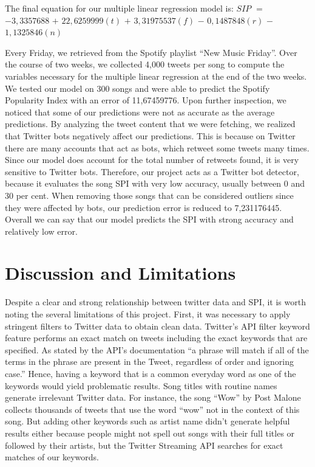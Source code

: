 \documentclass[12pt,conference]{IEEEtran}
\begin{document}
The final equation for our multiple linear regression model is: \newline
$SIP$ $=$ $-3,3357688$ $+$ $22,6259999(t)$ $+$ $3,31975537(f)$ $-$ $0,1487848(r)$ $-$ $1,1325846(n)$

Every Friday, we retrieved from the Spotify playlist ``New Music Friday''. Over the course of two weeks, we collected 4,000 tweets per song to compute the variables necessary for the multiple linear regression at the end of the two weeks. We tested our model on 300 songs and were able to predict the Spotify Popularity Index with an error of 11,67459776. Upon further inspection, we noticed that some of our predictions were not as accurate as the average predictions. By analyzing the tweet content that we were fetching, we realized that Twitter bots negatively affect our predictions. This is because on Twitter there are many accounts that act as bots, which retweet some tweets many times. Since our model does account for the total number of retweets found, it is very sensitive to Twitter bots. Therefore, our project acts as a Twitter bot detector, because it evaluates the song SPI with very low accuracy, usually between 0 and 30 per cent. When removing those songs that can be considered outliers since they were affected by bots, our prediction error is reduced to 7,231176445. Overall we can say that our model predicts the SPI with strong accuracy and relatively low error.


\section{Discussion and Limitations}
Despite a clear and strong relationship between twitter data and SPI, it is worth noting the several limitations of this project. First, it was necessary to apply stringent filters to Twitter data to obtain clean data. Twitter’s API filter keyword feature performs an exact match on tweets including the exact keywords that are specified. As stated by the API’s documentation “a phrase will match if all of the terms in the phrase are present in the Tweet, regardless of order and ignoring case.” Hence, having a keyword that is a common everyday word as one of the keywords would yield problematic results. Song titles with routine names generate irrelevant Twitter data. For instance, the song ``Wow'' by Post Malone collects thousands of tweets that use the word ``wow'' not in the context of this song. But adding other keywords such as artist name didn't generate helpful results either because people might not spell out songs with their full titles or followed by their artists, but the Twitter Streaming API searches for exact matches of our keywords. \par
\end{document}
